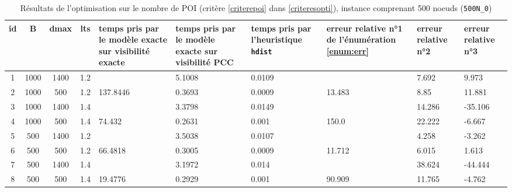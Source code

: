 \begin{sidewaystable}
    \vspace{1\baselineskip}
    \centering
    \caption{Résultats de l'optimisation sur le nombre de POI (critère \ref{criterepoi} dans \ref{criteresopti}), instance comprenant 500 noeuds (\texttt{500N\_0})}
    \label{tab:500ppoi}
    \begin{tabular}{|c|c|c|c|p{3cm}|p{3cm}|p{3cm}|p{2cm}|p{2cm}|p{2cm}|}
    \hline
    id & B & dmax & lts & temps pris par
    le modèle exacte sur visibilité exacte & temps pris par
    le modèle exacte sur visibilité PCC & temps pris par
    l'heuristique \verb|hdist| & erreur relative n°1 de l'énumération \ref{enum:err} & erreur relative n°2 & erreur relative n°3 \\
    \hline
    1 & 1000 & 1400 & 1.2 &  & 5.1008 & 0.0109 &  & 7.692 & 9.973 \\
    2 & 1000 & 500 & 1.2 & 137.8446 & 0.3693 & 0.0009 & 13.483 & 8.85 & 11.881 \\
    3 & 1000 & 1400 & 1.4 &  & 3.3798 & 0.0149 &  & 14.286 & -35.106 \\
    4 & 1000 & 500 & 1.4 & 74.432 & 0.2631 & 0.001 & 150.0 & 22.222 & -6.667 \\
    5 & 500 & 1400 & 1.2 &  & 3.5038 & 0.0107 &  & 4.258 & -3.262 \\
    6 & 500 & 500 & 1.2 & 66.4818 & 0.3005 & 0.0009 & 11.712 & 6.015 & 1.613 \\
    7 & 500 & 1400 & 1.4 &  & 3.1972 & 0.014 &  & 38.624 & -44.444 \\
    8 & 500 & 500 & 1.4 & 19.4776 & 0.2929 & 0.001 & 90.909 & 11.765 & -4.762 \\
    \hline
    \end{tabular}
\end{sidewaystable}


